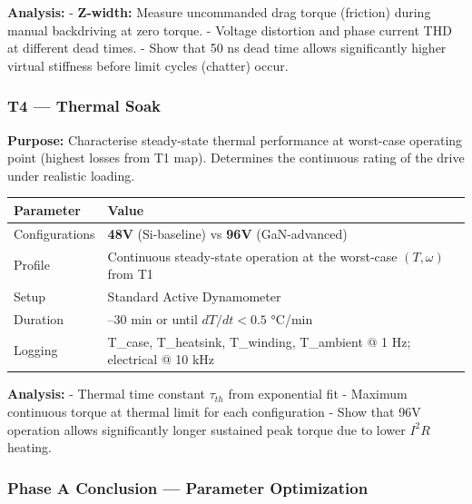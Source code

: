 \documentclass[
]{article}
\newcounter{none} %
\begin{document}
\textbf{Analysis:} - \textbf{Z-width:} Measure uncommanded drag torque
(friction) during manual backdriving at zero torque. - Voltage
distortion and phase current THD at different dead times. - Show that 50
ns dead time allows significantly higher virtual stiffness before limit
cycles (chatter) occur.

\subsubsection{T4 --- Thermal Soak}\label{t4-thermal-soak}

\textbf{Purpose:} Characterise steady-state thermal performance at
worst-case operating point (highest losses from T1 map). Determines the
continuous rating of the drive under realistic loading.

{\def\LTcaptype{none} %
\begin{longtable}[]{@{}
  >{\raggedright\arraybackslash}p{}
  >{\raggedright\arraybackslash}p{}@{}}
\toprule\noalign{}
\begin{minipage}[b]{\linewidth}\raggedright
Parameter
\end{minipage} & \begin{minipage}[b]{\linewidth}\raggedright
Value
\end{minipage} \\
\midrule\noalign{}
\endhead
\bottomrule\noalign{}
\endlastfoot
Configurations & \textbf{48V} (Si-baseline) vs \textbf{96V}
(GaN-advanced) \\
Profile & Continuous steady-state operation at the worst-case
\((T,\omega)\) from T1 \\
Setup & Standard Active Dynamometer \\
Duration & 20--30 min or until \(dT/dt < 0.5\) °C/min \\
Logging & T\_case, T\_heatsink, T\_winding, T\_ambient @ 1 Hz;
electrical @ 10 kHz \\
\end{longtable}
}

\textbf{Analysis:} - Thermal time constant \(\tau_{th}\) from
exponential fit - Maximum continuous torque at thermal limit for each
configuration - Show that 96V operation allows significantly longer
sustained peak torque due to lower \(I^2 R\) heating.

\subsubsection{Phase A Conclusion --- Parameter
Optimization}\label{phase-a-conclusion-parameter-optimization}
\end{document}

